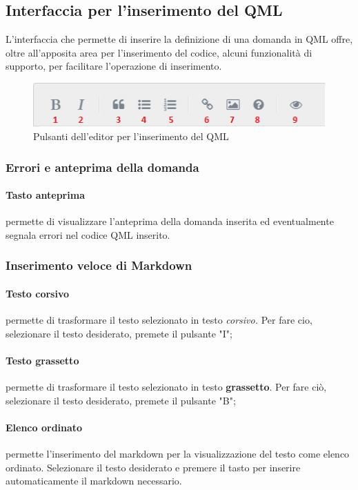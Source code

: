 \documentclass[12pt,a4paper]{article}
\begin{document}
	\subsection{Interfaccia per l'inserimento del QML}
	L'interfaccia che permette di inserire la definizione di una domanda in QML offre, oltre all'apposita area per l'inserimento del codice, alcuni funzionalità di supporto, per facilitare l'operazione di inserimento.
	
		\begin{figure}[H]	
			\centering
			\includegraphics[width=\linewidth]{../img/screenshot/simpleMDEMenu.png}
			\caption{Pulsanti dell'editor per l'inserimento del QML}
			\label{simpleMDEEditor}
		\end{figure}
		
		
	\subsubsection{Errori e anteprima della domanda}
	\paragraph{Tasto anteprima} permette di visualizzare l'anteprima della domanda inserita ed eventualmente segnala errori nel codice QML inserito.
	\subsubsection{Inserimento veloce di Markdown}
	\paragraph{Testo corsivo} permette di trasformare il testo selezionato in testo\textit{ corsivo.} 
	Per fare cio, selezionare il testo desiderato, premete il pulsante "I";
	\paragraph{Testo grassetto} permette di trasformare il testo selezionato in testo \textbf{grassetto}. 
	Per fare ciò, selezionare il testo desiderato, premete il pulsante "B";
	\paragraph{Elenco ordinato} permette l'inserimento del markdown per la visualizzazione del testo come elenco ordinato. 
	Selezionare il testo desiderato e premere il tasto per inserire automaticamente il markdown necessario.
\end{document}

